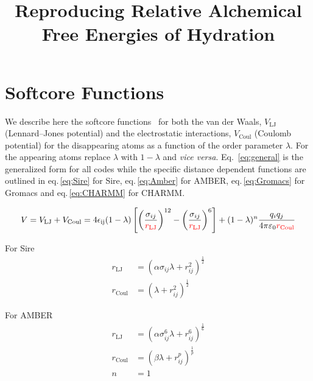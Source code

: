 \documentclass[journal=jctcce,manuscript=suppinfo]{achemso}
\title{Reproducing Relative Alchemical Free Energies of Hydration}
\begin{document}
\maketitle

\section{Softcore Functions}

We describe here the softcore functions~\cite{beutler_avoiding_1994,
  zacharias_separationshifted_1994} for both the van der Waals,
$V_{\mathrm{LJ}}$ (Lennard--Jones potential) and the electrostatic
interactions, $V_{\mathrm{Coul}}$ (Coulomb potential) for the
disappearing atoms as a function of the order parameter $\lambda$.
For the appearing atoms replace $\lambda$ with $1 - \lambda$ and
\emph{vice versa}.  Eq.\ \eqref{eq:general} is the generalized form
for all codes while the specific distance dependent functions are
outlined in eq.\,\eqref{eq:Sire} for Sire, eq.\,\eqref{eq:Amber} for
AMBER, eq.\,\eqref{eq:Gromacs} for Gromacs and eq.\,\eqref{eq:CHARMM}
for CHARMM.

\begin{equation}
  V = V_{\mathrm{LJ}} + V_{\mathrm{Coul}} =
  4\epsilon_{\mathrm{ij}}(1 - \lambda) \left[ \left(
      \frac{\sigma_{ij}}{\textcolor{red}{r_{\mathrm{LJ}}}}
    \right)^{12} - \left(
      \frac{\sigma_{ij}}{\textcolor{red}{r_{\mathrm{LJ}}}} \right)^{
      6} \right] +
  (1 - \lambda)^{n} \frac{q_{i}q_{j}}
  {4\pi\varepsilon_{0}\textcolor{red}{r_{\mathrm{Coul}}}}
  \label{eq:general}
\end{equation}

For Sire
\begin{equation}
  \begin{split}
    r_{\mathrm{LJ}} &= (\alpha\sigma_{ij}\lambda + r_{ij}^2)^{\frac{1}{2}} \\
    r_{\mathrm{Coul}} &=  (\lambda + r_{ij}^2)^{\frac{1}{2}}
  \end{split}
  \label{eq:Sire}
\end{equation}

For AMBER
\begin{equation}
  \begin{split}
    r_{\mathrm{LJ}} &= (\alpha \sigma_{ij}^{6} \lambda + %
                         r_{ij}^6)^{\frac{1}{6}} \\
    r_{\mathrm{Coul}} &= (\beta\lambda + r_{ij}^{p})^{\frac{1}{p}} \\
    n &= 1
  \end{split}
  \label{eq:Amber}
\end{equation}
\end{document}
